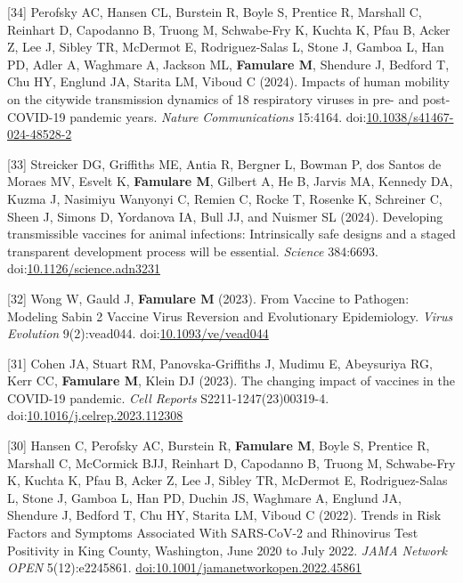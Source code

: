 \documentclass{article}
\begin{document}
\begin{llist}
\begin{items}
\item[{[34]}] Perofsky AC, Hansen CL, Burstein R, Boyle S, Prentice R, Marshall C, Reinhart D, Capodanno B, Truong M, Schwabe-Fry K, Kuchta K, Pfau B, Acker Z, Lee J, Sibley TR, McDermot E, Rodriguez-Salas L, Stone J, Gamboa L, Han PD, Adler A, Waghmare A, Jackson ML, \textbf{Famulare M}, Shendure J, Bedford T, Chu HY, Englund JA, Starita LM, Viboud C (2024). Impacts of human mobility on the citywide transmission dynamics of 18 respiratory viruses in pre- and post-COVID-19 pandemic years. \emph{Nature Communications} 15:4164. doi:\href{https://doi.org/10.1038/s41467-024-48528-2}{10.1038/s41467-024-48528-2}

\item[{[33]}] Streicker DG, Griffiths ME, Antia R, Bergner L, Bowman P, dos Santos de Moraes MV, Esvelt K, \textbf{Famulare M}, Gilbert A, He B, Jarvis MA, Kennedy DA, Kuzma J, Nasimiyu Wanyonyi C, Remien C, Rocke T, Rosenke K, Schreiner C, Sheen J, Simons D, Yordanova IA, Bull JJ, and Nuismer SL (2024). Developing transmissible vaccines for animal infections: Intrinsically safe designs and a staged transparent development process will be essential. \emph{Science} 384:6693. doi:\href{https://doi.org/10.1126/science.adn3231}{10.1126/science.adn3231} 

\item[{[32]}] Wong W, Gauld J, \textbf{Famulare M} (2023). From Vaccine to Pathogen: Modeling Sabin 2 Vaccine Virus Reversion and Evolutionary Epidemiology. \emph{Virus Evolution} 9(2):vead044.
doi:\href{https://doi.org/10.1093/ve/vead044}{10.1093/ve/vead044}

\item[{[31]}] Cohen JA, Stuart RM, Panovska-Griffiths J, Mudimu E, Abeysuriya RG, Kerr CC, \textbf{Famulare M}, Klein DJ (2023). The changing impact of vaccines in the COVID-19 pandemic. \emph{Cell Reports} S2211-1247(23)00319-4. doi:\href{https://doi.org/10.1016/j.celrep.2023.112308}{10.1016/j.celrep.2023.112308}

\item[{[30]}] Hansen C, Perofsky AC, Burstein R, \textbf{Famulare M}, Boyle S, Prentice R, Marshall C, McCormick BJJ, Reinhart D, Capodanno B, Truong M, Schwabe-Fry K, Kuchta K, Pfau B, Acker Z, Lee J, Sibley TR, McDermot E, Rodriguez-Salas L, Stone J, Gamboa L, Han PD, Duchin JS, Waghmare A, Englund JA, Shendure J, Bedford T, Chu HY, Starita LM, Viboud C (2022). Trends in Risk Factors and Symptoms Associated With SARS-CoV-2 and Rhinovirus Test Positivity in King County, Washington, June 2020 to July 2022. \emph{JAMA Network OPEN} 5(12):e2245861. \href{https://doi.org/10.1001/jamanetworkopen.2022.45861}{doi:10.1001/jamanetworkopen.2022.45861}


\end{items}
\end{llist}
\end{document}
